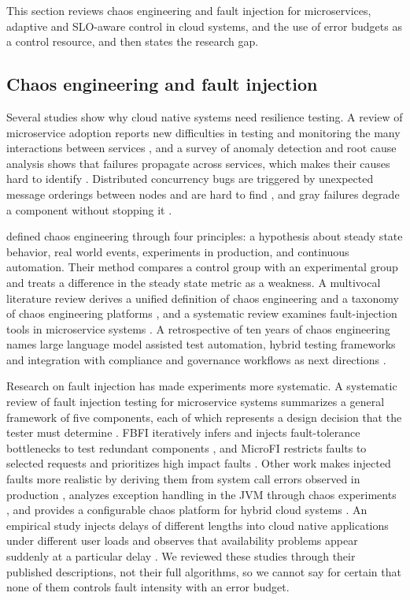 \documentclass[a4paper,fleqn,11pt]{cas-dc}
\begin{document}
This section reviews chaos engineering and fault injection for microservices, adaptive and SLO-aware control in cloud systems, and the use of error budgets as a control resource, and then states the research gap.

\subsection{Chaos engineering and fault injection}\label{sec:lit:ce}

Several studies show why cloud native systems need resilience testing. A review of microservice adoption reports new difficulties in testing and monitoring the many interactions between services \citep{soldani2018pains}, and a survey of anomaly detection and root cause analysis shows that failures propagate across services, which makes their causes hard to identify \citep{soldani2023anomaly}. Distributed concurrency bugs are triggered by unexpected message orderings between nodes and are hard to find \citep{lu2022cloudraid}, and gray failures degrade a component without stopping it \citep{ye2026a3sm}.

\citet{basiri2016chaos} defined chaos engineering through four principles: a hypothesis about steady state behavior, real world events, experiments in production, and continuous automation. Their method compares a control group with an experimental group and treats a difference in the steady state metric as a weakness. A multivocal literature review derives a unified definition of chaos engineering and a taxonomy of chaos engineering platforms \citep{owotogbe2026chaos}, and a systematic review examines fault-injection tools in microservice systems \citep{esen2026chaos}. A retrospective of ten years of chaos engineering names large language model assisted test automation, hybrid testing frameworks and integration with compliance and governance workflows as next directions \citep{owotogbe2026ten}.

Research on fault injection has made experiments more systematic. A systematic review of fault injection testing for microservice systems summarizes a general framework of five components, each of which represents a design decision that the tester must determine \citep{yu2025systematic}. FBFI iteratively infers and injects fault-tolerance bottlenecks to test redundant components \citep{wu2023enhancing}, and MicroFI restricts faults to selected requests and prioritizes high impact faults \citep{chen2024microfi}. Other work makes injected faults more realistic by deriving them from system call errors observed in production \citep{zhang2022maximizing}, analyzes exception handling in the JVM through chaos experiments \citep{zhang2021chaos}, and provides a configurable chaos platform for hybrid cloud systems \citep{camacho2022chaos}. An empirical study injects delays of different lengths into cloud native applications under different user loads and observes that availability problems appear suddenly at a particular delay \citep{ahmad2024exploring}. We reviewed these studies through their published descriptions, not their full algorithms, so we cannot say for certain that none of them controls fault intensity with an error budget.
\end{document}
